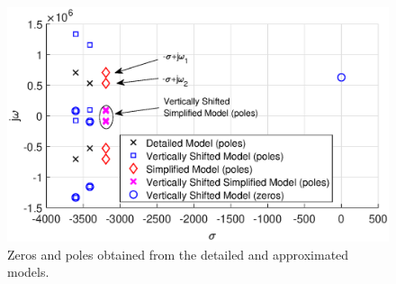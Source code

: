 \documentclass[journal,a4paper,10pt,twoside]{IEEEtran} %
\begin{document}
	 	\begin{figure}[t!]
	 	\begin{center}
	                \includegraphics[clip, trim=2mm 0cm 0.5cm 0cm, width=1\columnwidth]{FIGS/FIG7_POLES.eps}
	    \end{center}
	    \vspace{-3mm}
	    \caption{Zeros and poles obtained from the detailed and approximated models.}
	    \label{FIG7}
	    \vspace{-3mm}
	\end{figure}
\end{document}
